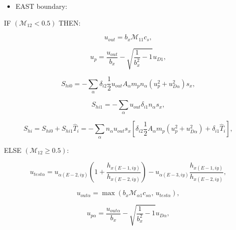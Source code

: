 \documentclass[11pt]{article}
\begin{document}
\bigskip

\begin{itemize}
\item  EAST boundary:
\end{itemize}

\bigskip

IF $\left( \mathcal{M}_{12}<0.5\right) $ THEN:

\begin{equation}
u_{out}=b_{x}\mathcal{M}_{11}c_{s}\text{,}   \label{c256}
\end{equation}

\begin{equation}
u_{p}=\frac{u_{out}}{b_{x}}-\sqrt{\frac{1}{b_{x}^{2}}-1}u_{D1}\text{,} 
\label{c257}
\end{equation}

\begin{equation}
S_{hi0}=-\sum_{\alpha}\delta_{i2}\frac{1}{2}u_{out}A_{\alpha}m_{p}n_{\alpha
}\left( u_{p}^{2}+u_{D\alpha}^{2}\right) s_{x}\text{,}   \label{c258}
\end{equation}

\begin{equation}
S_{hi1}=-\sum_{\alpha}u_{out}\delta_{i1}n_{\alpha}s_{x}\text{,} 
\label{c259}
\end{equation}

\begin{equation}
S_{hi}=S_{hi0}+S_{hi1}\widehat{T}_{i}=-\sum_{\alpha}n_{\alpha}u_{out}s_{x}%
\left[ \delta_{i2}\frac{1}{2}A_{\alpha}m_{p}\left(
u_{p}^{2}+u_{D\alpha}^{2}\right) +\delta_{i1}\widehat{T}_{i}\right] \text{,} 
\label{c260}
\end{equation}

\bigskip

ELSE $\left( \mathcal{M}_{12}\geq0.5\right) $:

\begin{equation}
u_{test\alpha}=u_{\alpha\left( E-2,iy\right) }\left( 1+\frac{h_{x\left(
E-1,iy\right) }}{h_{x\left( E-2,iy\right) }}\right) -u_{\alpha\left(
E-3,iy\right) }\frac{h_{x\left( E-1,iy\right) }}{h_{x\left( E-2,iy\right) }}%
\text{,}   \label{c261}
\end{equation}

\begin{equation}
u_{out\alpha}=\max\left( b_{x}\mathcal{M}_{\alpha1}c_{s\alpha}\text{, }%
u_{test\alpha}\right) \text{,}   \label{c262}
\end{equation}

\begin{equation}
u_{p\alpha}=\frac{u_{out\alpha}}{b_{x}}-\sqrt{\frac{1}{b_{x}^{2}}-1}%
u_{D\alpha}\text{,}   \label{c263}
\end{equation}
\end{document}
